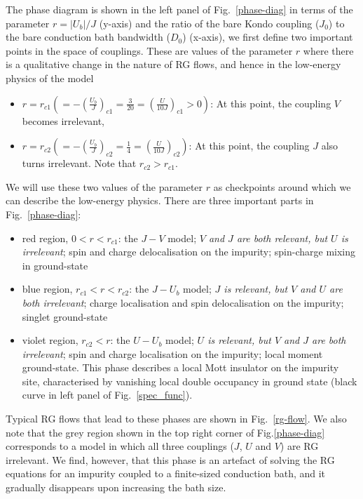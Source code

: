 \documentclass{iopart}
\begin{document}
The phase diagram is shown in the left panel of Fig.~\eqref{phase-diag} in terms of the parameter $r=|U_{b}|/J$ (y-axis) and the ratio of the bare Kondo coupling ($J_{0}$) to the bare conduction bath bandwidth ($D_{0}$) (x-axis), we first define two important points in the space of couplings. These are values of the parameter \(r\) where there is a qualitative change in the nature of RG flows, and hence in the low-energy physics of the model
\begin{itemize}
	\item \(r = r_{c1} \left(= -\left(\frac{U_b}{J}\right)_{c1} = \frac{3}{20} = \left(\frac{U}{10 J}\right)_{c1}>0\right)\): At this point, the coupling \(V\) becomes irrelevant,
	\item \(r = r_{c2} \left(= -\left(\frac{U_b}{J}\right)_{c2} = \frac{1}{4} = \left(\frac{U}{10 J}\right)_{c2}\right)\): At this point, the coupling \(J\) also turns irrelevant. Note that $r_{c2} > r_{c1}$.
\end{itemize}
We will use these two values of the parameter $r$ as checkpoints around which we can describe the low-energy physics. 
There are three important parts in Fig.~\eqref{phase-diag}:
\begin{itemize}
	\item red region, \(0 < r < r_{c1}\): the \(J-V\) model; {\it \(V\) and \(J\) are both relevant, but $U$ is irrelevant}; spin and charge delocalisation on the impurity; spin-charge mixing in ground-state
	\item blue region, \(r_{c1} < r < r_{c2}\): the \(J-U_b\) model; {\it $J$ is relevant, but \(V\) and $U$ are both irrelevant}; charge localisation and spin delocalisation on the impurity; singlet ground-state
	\item violet region, \(r_{c2} < r\): the \(U-U_b\) model; {\it $U$ is relevant, but \(V\) and \(J\) are both irrelevant}; spin and charge localisation on the impurity; local moment ground-state. This phase describes a local Mott insulator on the impurity site, characterised by vanishing local double occupancy in ground state (black curve in left panel of Fig.~\ref{spec_func}).
\end{itemize}
Typical RG flows that lead to these phases are shown in Fig.~\eqref{rg-flow}. We also note that the grey region shown in the top right corner of Fig.\eqref{phase-diag} corresponds to a model in which all three couplings ($J$, $U$ and $V$) are RG irrelevant. We find, however, that this phase is an artefact of solving the RG equations for an impurity coupled to a finite-sized conduction bath, and it gradually disappears upon increasing the bath size.
\end{document}
